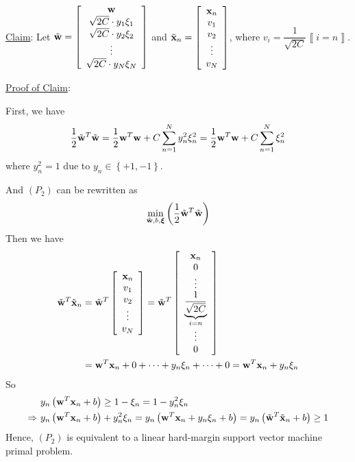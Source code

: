 \documentclass[12pt]{article}
\newcommand{\CBrackets}[1]{\left\{#1\right\}}
\newcommand{\SBrackets}[1]{\left[#1\right]}
\newcommand{\BooBrackets}[1]{\left\llbracket#1\right\rrbracket}
\newcommand{\ParTh}[1]{\left(#1\right)}
\newcommand{\BF}[1]{{\bf#1}}
\newcommand{\Matrix}[2]{\SBrackets{\begin{array}{#1}#2\end{array}}}
\begin{document}
\underline{Claim}: Let $\tilde{\BF{w}}=\Matrix{c}{\BF{w}\\\sqrt{2C}\cdot y_1\xi_1\\\sqrt{2C}\cdot y_2\xi_2\\\vdots\\\sqrt{2C}\cdot y_N\xi_N}$ and $\tilde{\BF{x}}_n=\Matrix{c}{\BF{x}_n\\v_1\\v_2\\\vdots\\v_N}$, where $v_i=\dfrac{1}{\sqrt{2C}}\BooBrackets{i=n}$.

\underline{Proof of Claim}:

First, we have
\begin{align}
\dfrac{1}{2}\tilde{\BF{w}}^T\tilde{\BF{w}}=\dfrac{1}{2}\BF{w}^T\BF{w}+C\sum_{n=1}^{N}y^2_n\xi^2_n=\dfrac{1}{2}\BF{w}^T\BF{w}+C\sum_{n=1}^{N}\xi^2_n
\end{align}
where $y^2_n=1$ due to $y_n\in\CBrackets{+1,-1}$.

And $\ParTh{P_2}$ can be rewritten as
\begin{align}
\min_{\tilde{\BF{w}},b,\bm{\xi}}\ParTh{\dfrac{1}{2}\tilde{\BF{w}}^T\tilde{\BF{w}}}
\end{align}
Then we have
\begin{align}
\tilde{\BF{w}}^T\tilde{\BF{x}}_n&=\tilde{\BF{w}}^T\Matrix{c}{\BF{x}_n\\v_1\\v_2\\\vdots\\v_N}=\tilde{\BF{w}}^T\Matrix{c}{\BF{x}_n\\0\\\vdots\\\underbrace{\dfrac{1}{\sqrt{2C}}}_{i=n}\\\vdots\\0}\\
&=\BF{w}^T\BF{x}_n+0+\cdots+y_n\xi_n+\cdots+0=\BF{w}^T\BF{x}_n+y_n\xi_n
\end{align}
So
\begin{align}
&y_n\ParTh{\BF{w}^T\BF{x}_n+b}\geq1-\xi_n=1-y^2_n\xi_n\\
\Rightarrow ~&y_n\ParTh{\BF{w}^T\BF{x}_n+b}+y^2_n\xi_n=y_n\ParTh{\BF{w}^T\BF{x}_n+y_n\xi_n+b}=y_n\ParTh{\tilde{\BF{w}}^T\tilde{\BF{x}}_n+b}\geq1
\end{align}
Hence, $\ParTh{P_2}$ is equivalent to a linear hard-margin support vector machine primal problem.
\end{document}
